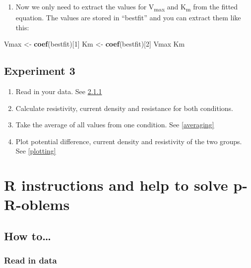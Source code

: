 \documentclass[
]{book}
\newenvironment{Shaded}{\begin{snugshade}}{\end{snugshade}}
\newcommand{\DecValTok}[1]{\textcolor[rgb]{0.00,0.00,0.81}{#1}}
\newcommand{\FunctionTok}[1]{\textcolor[rgb]{0.13,0.29,0.53}{\textbf{#1}}}
\newcommand{\NormalTok}[1]{#1}
\newcommand{\OtherTok}[1]{\textcolor[rgb]{0.56,0.35,0.01}{#1}}
\providecommand{\tightlist}{%
  \setlength{\itemsep}{0pt}\setlength{\parskip}{0pt}}
\begin{document}
\begin{enumerate}
\def\labelenumi{\arabic{enumi}.}
\setcounter{enumi}{4}
\tightlist
\item
  Now we only need to extract the values for V\textsubscript{max} and K\textsubscript{m} from the fitted equation. The values are stored in ``bestfit'' and you can extract them like this:
\end{enumerate}

\begin{Shaded}
\begin{Highlighting}[]
\NormalTok{Vmax }\OtherTok{\textless{}{-}} \FunctionTok{coef}\NormalTok{(bestfit)[}\DecValTok{1}\NormalTok{]}
\NormalTok{Km }\OtherTok{\textless{}{-}} \FunctionTok{coef}\NormalTok{(bestfit)[}\DecValTok{2}\NormalTok{]}
\NormalTok{Vmax}
\NormalTok{Km}
\end{Highlighting}
\end{Shaded}

\section{Experiment 3}\label{experiment-3}

\begin{enumerate}
\def\labelenumi{\arabic{enumi}.}
\item
  Read in your data. See \ref{reading}
\item
  Calculate resistivity, current density and resistance for both conditions.
\item
  Take the average of all values from one condition. See \ref{averaging}
\item
  Plot potential difference, current density and resistivity of the two groups. See \ref{plotting}
\end{enumerate}

\chapter{R instructions and help to solve p-R-oblems}\label{r-instructions-and-help-to-solve-p-r-oblems}

\section{How to\ldots{}}\label{how-to}

\subsection{Read in data}\label{reading}
\end{document}
